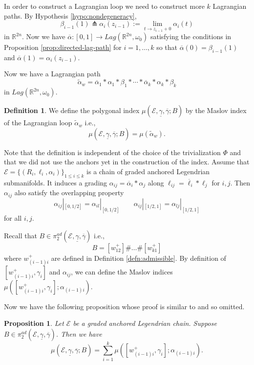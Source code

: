 \documentclass[reqno]{amsart}
\def\R{\ifmmode{\mathbb R}\else{$\mathbb R$}\fi} %
\newcommand{\be}{\begin{equation}}
\newcommand{\ee}{\end{equation}}
\theoremstyle{theorem}
\newtheorem{prop}[thm]{Proposition}
\theoremstyle{definition}
\newtheorem{defn}[thm]{Definition}
\numberwithin{equation}{section}
\def\R{{\mathbb R}}
\def\R{{\mathbb R}}
\def\R{\ifmmode{\mathbb R}\else{$\mathbb R$}\fi} %
\def\R{{\mathbb R}}
\def\R{{\mathbb R}}
\begin{document}
In order to construct a Lagrangian loop we need to construct more $k$ Lagrangian paths. By Hypothesis \ref{hypo:nondegeneracy},
$$ \beta_{i-1}(1) \pitchfork \alpha_i(z_{i-1}):= \lim_{t\rightarrow z_{i-1}+0}\alpha_i(t)$$
in $\R^{2n}$. Now we have $\overline{\alpha}:[0,1] \rightarrow Lag(\R^{2n},\omega_0)$ satisfying the conditions in Proposition \ref{prop:directed-lag-path} for $i=1,\ldots,k$ so that $\overline{\alpha}(0)=\beta_{i-1}(1)$ and $\overline{\alpha}(1)=\alpha_i(z_{i-1})$.

Now we have a Lagrangian path
$$\widetilde{\alpha}_w = \overline{\alpha}_1\ast\alpha_1\ast\beta_1\ast\cdots\ast
\overline{\alpha}_k\ast\alpha_k\ast\beta_k$$
in $Lag(\R^{2n},\omega_0)$.

\begin{defn}
We define the polygonal index $\mu(\mathcal{E},\underline \gamma,\overline \gamma;B)$ by the Maslov index of the Lagrangian loop $\widetilde{\alpha}_w$ i.e.,
$$\mu(\mathcal{E},\underline \gamma,\overline \gamma;B) = \mu(\widetilde{\alpha}_w).$$
\end{defn}

Note that the definition is independent of the choice of the trivialization $\Phi$ and that we did not use the anchors yet in the construction of the index. Assume that $\mathcal{E} = \{(R_i,\ell_i,\alpha_i)\}_{1\leq i\leq k}$ is a chain of graded anchored Legendrian submanifolds. It induces a grading $\alpha_{ij} = \overline{\alpha}_i\ast\alpha_j$ along $\ell_{ij} = \overline{\ell}_i\ast\ell_j$ for $i,j$. Then $\alpha_{ij}$ also satisfy the overlapping property
\be\label{eq:graded-overlapping}
\alpha_{ij}|_{[0,1/2]}=\alpha_{il}|_{[0,1/2]} \qquad \alpha_{ij}|_{[1/2,1]}=\alpha_{lj}|_{[1/2,1]}
\ee
for all $i,j$.

Recall that $B\in \pi^{ad}_2(\mathcal{E},\underline \gamma,\overline \gamma)$ i.e.,
$$
B = [w_{12}^+]\#\ldots\#[w_{k1}^+]
$$
where $w_{(i-1)i}^+$ are defined in Definition \ref{defn:admissible}.
By definition of $[w_{(i-1)i}^+,\gamma_i]$ and $\alpha_{ij}$, we can define the Maslov indices $\mu([w_{(i-1)i}^+,\gamma_i];\alpha_{(i-1)i})$.

Now we have the following proposition whose proof is similar to \cite[Lemma 5.12]{fooo:anchored}
and so omitted.

\begin{prop}\label{prop:decomp-index}
Let $\mathcal{E}$ be a graded anchored Legendrian chain. Suppose $B\in\pi^{ad}_2(\mathcal{E},\underline \gamma,\overline \gamma)$. Then we have
$$ \mu(\mathcal{E},\underline \gamma,\overline \gamma;B) = \sum_{i=1}^{k}\mu([w_{(i-1)i}^+,\gamma_i];\alpha_{(i-1)i}). $$
\end{prop}
\end{document}

